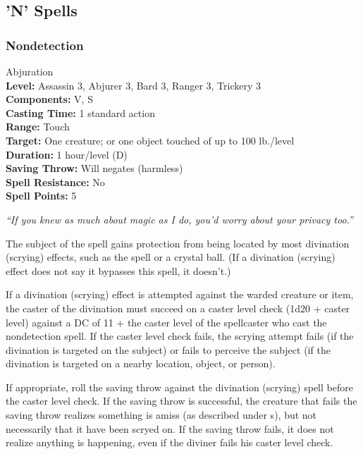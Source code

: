 \subsection{'N' Spells}
\subsubsection{Nondetection}
\label{Spell:Nondetection}
Abjuration
\\ \textbf{Level:} Assassin 3, Abjurer 3, Bard 3, Ranger 3, Trickery 3
\\ \textbf{Components:} V, S
\\ \textbf{Casting Time:} 1 standard action
\\ \textbf{Range:} Touch
\\ \textbf{Target:} One creature; or one object touched of up to 100 lb./level
\\ \textbf{Duration:} 1 hour/level (D)
\\ \textbf{Saving Throw:} Will negates (harmless)
\\ \textbf{Spell Resistance:} No
\\ \textbf{Spell Points:} 5

\emph{``If you knew as much about magic as I do, you'd worry about your privacy too.''}

The subject of the spell gains protection from being located by most divination (scrying) effects, 
such as the  spell or a crystal ball. 
(If a divination (scrying) effect does not say it bypasses this spell, it doesn't.)

If a divination (scrying) effect is attempted against the warded creature or item, 
the caster of the divination must succeed on a caster level check (1d20 + caster level) 
against a DC of 11 + the caster level of the spellcaster who cast the nondetection spell.
If the caster level check fails, the scrying attempt fails
(if the divination is targeted on the subject) or fails to perceive the subject 
(if the divination is targeted on a nearby location, object, or person).

If appropriate, roll the saving throw against the divination (scrying) spell before the caster level check.
If the saving throw is successful, the creature that fails the saving throw realizes something is amiss 
(as described under s),
but not necessarily that it have been scryed on.
If the saving throw fails, it does not realize anything is happening, even if the diviner fails his caster level check.

